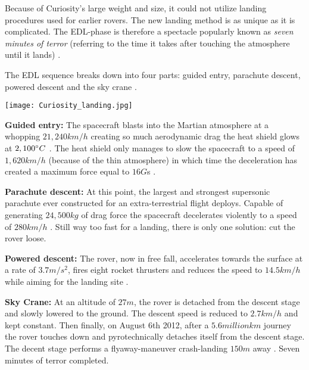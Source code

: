 \begin{tcolorbox}[colback=red!5,colframe=DarkRed!40!black,title=Entry\, Descent and Landing (EDL)]
Because of Curiosity’s large weight and size, it could not utilize landing procedures used for earlier rovers.
The new landing method is as unique as it is complicated.
The EDL-phase is therefore a spectacle popularly known as \textit{seven minutes of terror} (referring to the time it takes after touching the atmosphere until it lands) \cite{CNN_7minterror}. 

The EDL sequence breaks down into four parts: guided entry, parachute descent, powered descent and the sky crane \cite{NASALanding}.

{\centering
\texttt{[image: Curiosity\_landing.jpg]}
\par}

\textbf{Guided entry:}
The spacecraft blasts into the Martian atmosphere at a whopping $21,240 km/h$ creating so much aerodynamic drag the heat shield glows at $2,100 \degree C$ \cite{NASA_youtube}.
The heat shield only manages to slow the spacecraft to a speed of $1,620 km/h$ (because of the thin atmosphere) in which time the deceleration has created a maximum force equal to $16 G$s \cite{HistoricLanding} \cite{NASALanding}.

\textbf{Parachute descent:}
At this point, the largest and strongest supersonic parachute ever constructed for an extra-terrestrial flight deploys.
Capable of generating $24,500 kg$ of drag force the spacecraft decelerates violently to a speed of $280 km/h$ \cite{Parachute} \cite{NASALanding}.
Still way too fast for a landing, there is only one solution: cut the rover loose.

\textbf{Powered descent:}
The rover, now in free fall, accelerates towards the surface at a rate of $3.7 m/s^{2}$, fires eight rocket thrusters and reduces the speed to $14.5 km/h$ while aiming for the landing site \cite{HistoricLanding} \cite{NASALanding}. 

\textbf{Sky Crane:}
At an altitude of $27 m$, the rover is detached from the descent stage and slowly lowered to the ground.
The descent speed is reduced to $2.7 km/h$ and kept constant.
Then finally, on August 6th 2012, after a $5.6 million km$ \cite{CNNCuriosity} journey the rover touches down and pyrotechnically detaches itself from the descent stage.
The decent stage performs a flyaway-maneuver crash-landing $150 m$ away \cite{HistoricLanding} \cite{NASALanding}. Seven minutes of terror completed.
\end{tcolorbox}